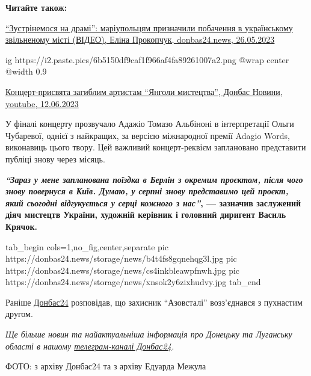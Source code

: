 \textbf{Читайте також:} 

\href{https://donbas24.news/news/zustrinemosya-na-drami-mariupolciv-rozculilo-proniklive-video-pro-ridne-misto-video}{%
\enquote{Зустрінемося на драмі}: маріупольцям призначили побачення в українському звільненому місті (ВІДЕО), %
Еліна Прокопчук, donbas24.news, 26.05.2023%
}

\ifcmt
  ig https://i2.paste.pics/6b5150df9caf1f966af4fa89261007a2.png
  @wrap center
  @width 0.9
\fi

\href{https://youtu.be/D0xOY1ya7os}{Концерт-присвята загиблим артистам \enquote{Янголи мистецтва}, Донбас Новини, youtube, 12.06.2023}

У фіналі концерту прозвучало Адажіо Томазо Альбіноні в інтерпретації Ольги
Чубаревої, однієї з найкращих, за версією міжнародної премії Adagio Words,
виконавиць цього твору. Цей важливий концерт-реквієм заплановано представити
публіці знову через місяць. 

\begin{leftbar}
  \begingroup
    \bfseries
{\em\color{blue}\enquote{Зараз у мене запланована поїздка в Берлін з окремим проєктом, після чого
знову повернуся в Київ. Думаю, у серпні знову представимо цей проєкт,
який сьогодні відгукується у серці кожного з нас}}, — зазначив
заслужений діяч мистецтв України, художній керівник і головний диригент
Василь Крячок.
  \endgroup
\end{leftbar}

\ifcmt
  tab_begin cols=1,no_fig,center,separate
     pic https://donbas24.news/storage/news/b4t4fs8gqnehqg3l.jpg
     pic https://donbas24.news/storage/news/cs4inkbleawpfnwh.jpg
     pic https://donbas24.news/storage/news/xnsok2y6zixhudvy.jpg
  tab_end
\fi

Раніше \href{https://donbas24.news}{Донбас24} розповідав, що захисник \enquote{Азовсталі} возз'єднався з пухнастим
другом.

\begingroup
\em
Ще більше новин та найактуальніша інформація про Донецьку та Луганську області
в нашому \href{https://t.me/donbas24}{телеграм-каналі Донбас24}.

ФОТО: з архіву Донбас24 та з архіву Едуарда Межула 
\endgroup


